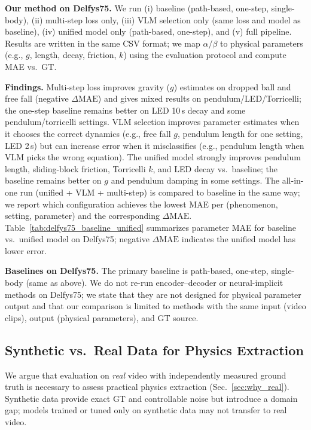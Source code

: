 \textbf{Our method on Delfys75.} We run (i) baseline (path-based, one-step, single-body), (ii) multi-step loss only, (iii) VLM selection only (same loss and model as baseline), (iv) unified model only (path-based, one-step), and (v) full pipeline. Results are written in the same CSV format; we map $\alpha$/$\beta$ to physical parameters (e.g., $g$, length, decay, friction, $k$) using the evaluation protocol and compute MAE vs.\ GT.

\textbf{Findings.} Multi-step loss improves gravity ($g$) estimates on dropped ball and free fall (negative $\Delta\mathrm{MAE}$) and gives mixed results on pendulum/LED/Torricelli; the one-step baseline remains better on LED 10\,s decay and some pendulum/torricelli settings. VLM selection improves parameter estimates when it chooses the correct dynamics (e.g., free fall $g$, pendulum length for one setting, LED 2\,s) but can increase error when it misclassifies (e.g., pendulum length when VLM picks the wrong equation). The unified model strongly improves pendulum length, sliding-block friction, Torricelli $k$, and LED decay vs.\ baseline; the baseline remains better on $g$ and pendulum damping in some settings. The all-in-one run (unified + VLM + multi-step) is compared to baseline in the same way; we report which configuration achieves the lowest MAE per (phenomenon, setting, parameter) and the corresponding $\Delta\mathrm{MAE}$. Table~\ref{tab:delfys75_baseline_unified} summarizes parameter MAE for baseline vs.\ unified model on Delfys75; negative $\Delta\mathrm{MAE}$ indicates the unified model has lower error.

\textbf{Baselines on Delfys75.} The primary baseline is path-based, one-step, single-body (same as above). We do not re-run encoder--decoder or neural-implicit methods on Delfys75; we state that they are not designed for physical parameter output and that our comparison is limited to methods with the same input (video clips), output (physical parameters), and GT source.

\subsection{Synthetic vs.\ Real Data for Physics Extraction}
\label{sec:exp_synthetic_vs_real}

We argue that evaluation on \emph{real} video with independently measured ground truth is necessary to assess practical physics extraction (Sec.~\ref{sec:why_real}). Synthetic data provide exact GT and controllable noise but introduce a domain gap; models trained or tuned only on synthetic data may not transfer to real video.

